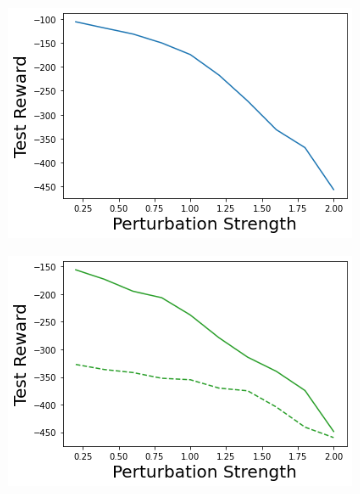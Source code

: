 \begin{figure}
\begin{subfigure}{.24\textwidth}
    \end{subfigure}
    \begin{subfigure}{.24\textwidth}
        \includegraphics[width=\textwidth]{sections/011_icml2022/resources/action_shift-DKL-AcrobotShift-v0-mean_reward_.png}
    \end{subfigure}
    \begin{subfigure}{.24\textwidth}
        \includegraphics[width=\textwidth]{sections/011_icml2022/resources/action_shift-PostNet-AcrobotShift-v0-mean_reward_.png}
    \end{subfigure}
    

\end{figure}
